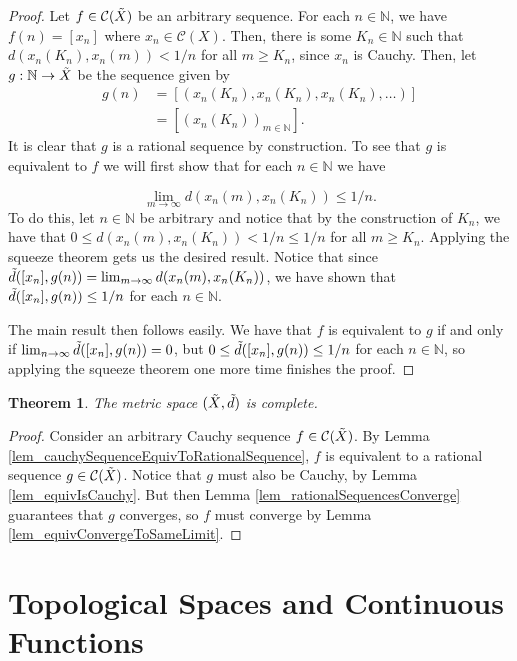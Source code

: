 \documentclass{report}
\newtheorem{theorem}{Theorem}[section]
\theoremstyle{definition}
\theoremstyle{remark}
\newcommand{\N}{\mathbb{N}}
\newcommand{\seq}[2][n \in \N]{\left( #2 \right)_{#1}}
\newcommand{\prt}[1]{\mathcal{#1}}
\begin{document}
\begin{proof}
    Let $f \in \prt{C}(\Tilde{X})$ be an arbitrary sequence.
    For each $n \in \N$, we have $f(n) = [x_n]$ where $x_n \in \prt{C}(X)$. Then, there is some $K_n \in \N$ such that $d(x_n(K_n), x_n(m)) < 1/n$ for all $m \geq K_n$, since $x_n$ is Cauchy. Then, let $g: \N \to \Tilde{X}$ be the sequence given by 
    \begin{align*}
        g(n) &= [(x_n(K_n), x_n(K_n), x_n(K_n), \dots)] \\
             &= [\seq[m \in \N]{x_n(K_n)}].
    \end{align*} It is clear that $g$ is a rational sequence by construction. To see that $g$ is equivalent to $f$ we will first show that for each $n \in \N$ we have 
    
    \begin{equation*}
        \lim_{m \to \infty} d(x_n(m), x_n(K_n)) \leq 1/n.
    \end{equation*} To do this, let $n \in \N$ be arbitrary and notice that by the construction of $K_n$, we have that $0 \leq d(x_n(m), x_n(K_n)) < 1/n \leq 1/n$ for all $m \geq K_n$. Applying the squeeze theorem gets us the desired result. Notice that since $\Tilde{d}([x_n], g(n)) = \lim_{m \to \infty} d(x_n(m), x_n(K_n))$, we have shown that $\Tilde{d}([x_n], g(n)) \leq 1/n$ for each $n \in \N$.
    
    The main result then follows easily. We have that $f$ is equivalent to $g$ if and only if $\lim_{n \to \infty} \Tilde{d}([x_n], g(n)) = 0$, but $0 \leq \Tilde{d}([x_n], g(n))  \leq 1/n$ for each $n \in \N$, so applying the squeeze theorem one more time finishes the proof.
\end{proof}

\begin{theorem}
    The metric space $(\Tilde{X}, \Tilde{d})$ is complete.
\end{theorem}

\begin{proof}
    Consider an arbitrary Cauchy sequence $f \in \prt{C}(\Tilde{X})$. By Lemma \ref{lem_cauchySequenceEquivToRationalSequence}, $f$ is equivalent to a rational sequence $g \in \prt{C}(\Tilde{X})$. Notice that $g$ must also be Cauchy, by Lemma \ref{lem_equivIsCauchy}. But then Lemma \ref{lem_rationalSequencesConverge} guarantees that $g$ converges, so $f$ must converge by Lemma \ref{lem_equivConvergeToSameLimit}.
\end{proof}

\chapter{Topological Spaces and Continuous Functions}
\end{document}
